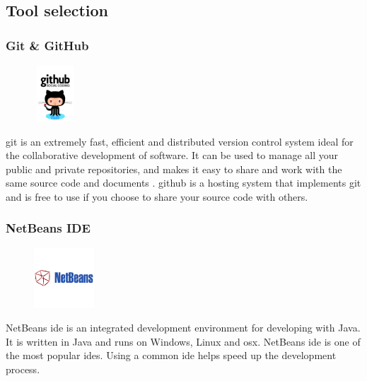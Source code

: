 \subsection{Tool selection}
\subsubsection{Git \& GitHub}
\begin{figure}
  \vspace{-40pt}
  \begin{center}
    \includegraphics[width=60px,height=80px]{GitHub}
  \end{center}

\end{figure}
\gls{git} is an extremely fast, efficient and distributed version control system ideal for the collaborative development of software. It can be used to manage all your public and private repositories, and makes it easy to share and work with the same source code and documents \cite{bib:git}. \gls{github} is a hosting system that implements git and is free to use if you choose to share your source code with others. 

\pagebreak

\subsubsection{NetBeans IDE}
\begin{figure}
  \vspace{-65pt}
  \begin{center}
    \includegraphics[width=0.2\textwidth]{NetBeans}
  \end{center}

\end{figure}
NetBeans \gls{ide} is an integrated development environment for developing with Java. It is written in Java and runs on Windows, Linux and \gls{osx}. NetBeans \gls{ide} is one of the most popular \gls{ide}s. Using a common \gls{ide} helps speed up the development process.   

